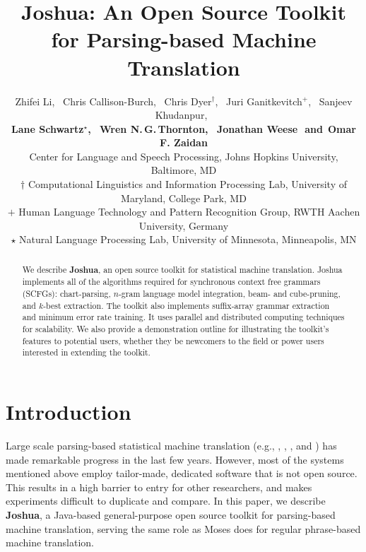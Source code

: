 \documentclass[11pt]{article}
\title{Joshua: An Open Source Toolkit for Parsing-based Machine Translation}
\author{
Zhifei Li,\,\,\,
Chris Callison-Burch,\,\,\, %
Chris Dyer$^\dagger$,\,\,\,
Juri Ganitkevitch$^+$,\,\,\,
Sanjeev Khudanpur,\,\,\, \\
{\bf Lane Schwartz$^\star$,\,\,\,
Wren N.\,G.\,Thornton,\,\,\,
Jonathan Weese\,\,
{\textnormal{and}}\,\,\,Omar F. Zaidan}\\
Center for Language and Speech Processing, Johns Hopkins University, Baltimore, MD\\
$\dagger$ Computational Linguistics and Information Processing Lab, University of Maryland, College Park, MD\\
$+$ Human Language Technology and Pattern Recognition Group, RWTH Aachen University, Germany\\
$\star$ Natural Language Processing Lab, University of Minnesota, Minneapolis, MN }
\date{}
\begin{document}
\maketitle


\begin{abstract}

We describe \textbf{Joshua}, an open source toolkit for statistical machine translation. Joshua implements all of the algorithms required for synchronous context free grammars (SCFGs): chart-parsing, $n$-gram language model integration, beam- and cube-pruning, and $k$-best extraction. The toolkit also implements suffix-array grammar extraction and minimum error rate training. It uses parallel and distributed computing techniques for scalability. We also provide a demonstration outline for illustrating the toolkit's features to potential users, whether they be newcomers to the field or power users interested in extending the toolkit.

\end{abstract}


\section{Introduction}

Large scale parsing-based statistical machine translation (e.g., , , , and ) has made remarkable progress in the last few years.
However, most of the systems mentioned above employ tailor-made, dedicated software that is not open source.  This results in a high barrier to entry for other researchers, and makes experiments difficult to duplicate and compare.
In this paper, we describe \textbf{Joshua}, a Java-based general-purpose open source toolkit for parsing-based machine translation, serving the same role as Moses \cite{Moses} does for regular phrase-based machine translation.


\end{document}

